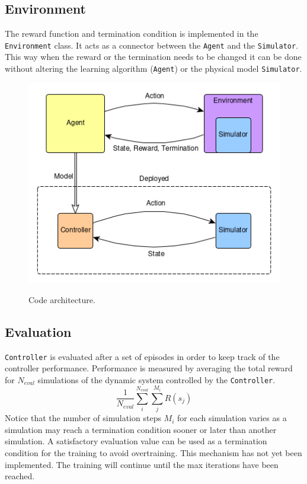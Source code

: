 \documentclass{LTHtwocol} %
\begin{document}
\subsection{Environment}
The reward function and termination condition is implemented in the \texttt{Environment} class.
It acts as a connector between the \texttt{Agent} and the \texttt{Simulator}.
This way when the reward or the termination needs to be changed it can be done without altering the learning algorithm (\texttt{Agent}) or the physical model \texttt{Simulator}.



\begin{figure}[H]
	\centering
	\includegraphics[width=0.9\columnwidth]{figures/CodeStructure.png}
	\label{fig:code_architecture}
	\caption{Code architecture.}
\end{figure}

\subsection{Evaluation}
\texttt{Controller} is evaluated after a set of episodes in order to keep track of the controller performance.
Performance is measured by averaging the total reward for $N_{eval}$ simulations of the dynamic system controlled by the \texttt{Controller}.
\begin{equation}
	\label{eqn:evaluation_equation}
	\frac{1}{N_{eval}} \sum_i^{N_{eval}} \sum_j^{M_i} R(s_j)
\end{equation}
Notice that the number of simulation steps $M_i$ for each simulation varies as a simulation may reach a termination condition sooner or later than another simulation.
A satisfactory evaluation value can be used as a termination condition for the training to avoid overtraining.
This mechanism has not yet been implemented.
The training will continue until the max iterations have been reached.
\end{document}
